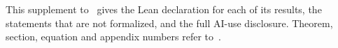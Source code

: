 \newcommand{\papertitle}{Supplement to ``A log-concavity criterion for finite nonnegative linearization'': formalization and AI use}
\newcommand{\papershort}{SUPPLEMENT: A LOG-CONCAVITY CRITERION FOR FINITE LINEARIZATION}
\newcommand{\paperdate}{November 1, 2026}



\maketitle

\noindent This supplement to~\cite{main} gives the Lean declaration for each of its results, the statements that are not formalized, and the full AI-use disclosure. Theorem, section, equation and appendix numbers refer to~\cite{main}.

